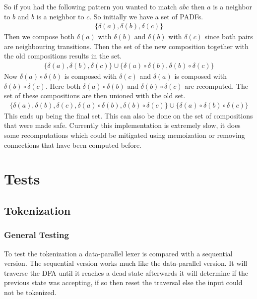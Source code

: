 \documentclass[a4paper,12pt]{article}
\theoremstyle{definition}
\begin{document}
So if you had the following pattern you wanted to match $abc$ then $a$ is a neighbor to $b$ and $b$ is a neighbor to $c$. So initially we have a set of PADFs.
\begin{align*}
  \{\delta(a), \delta(b), \delta(c)\}
\end{align*}
Then we compose both $\delta(a)$ with $\delta(b)$ and $\delta(b)$ with $\delta(c)$ since both pairs are neighbouring transitions. Then the set of the new composition together with the old compositions results in the set.
\begin{align*}
  \{\delta(a), \delta(b), \delta(c)\} \cup \{\delta(a) \circ \delta(b), \delta(b) \circ \delta(c)\}
\end{align*}
Now $\delta(a) \circ \delta(b)$ is composed with $\delta(c)$ and $\delta(a)$ is composed with $\delta(b) \circ \delta(c)$. Here both $\delta(a) \circ \delta(b)$ and $\delta(b) \circ \delta(c)$ are recomputed. The set of these compositions are then unioned with the old set.
\begin{align*}
  \{\delta(a), \delta(b), \delta(c), \delta(a) \circ \delta(b), \delta(b) \circ \delta(c)\} \cup \{\delta(a) \circ \delta(b) \circ \delta(c)\}
\end{align*}
This ends up being the final set. This can also be done on the set of compositions that were made safe. Currently this implementation is extremely slow, it does some recomputations which could be mitigated using memoization or removing connections that have been computed before.

\section{Tests}
\subsection{Tokenization}
\subsubsection{General Testing}
To test the tokenization a data-parallel lexer is compared with a sequential version. The sequential version works much like the data-parallel version. It will traverse the DFA until it reaches a dead state afterwards it will determine if the previous state was accepting, if so then reset the traversal else the input could not be tokenized.
\end{document}
